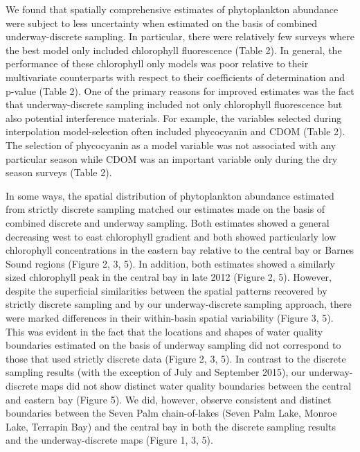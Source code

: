 \documentclass[review]{elsarticle}
\begin{document}
We found that spatially comprehensive estimates of phytoplankton abundance were subject to less uncertainty when estimated on the basis of combined underway-discrete sampling. In particular, there were relatively few surveys where the best model only included chlorophyll fluorescence (Table 2). In general, the performance of these chlorophyll only models was poor relative to their multivariate counterparts with respect to their coefficients of determination and p-value (Table 2). One of the primary reasons for improved estimates was the fact that underway-discrete sampling included not only chlorophyll fluorescence but also potential interference materials. For example, the variables selected during interpolation model-selection often included phycocyanin and CDOM (Table 2). The selection of phycocyanin as a model variable was not associated with any particular season while CDOM was an important variable only during the dry season surveys (Table 2). 

In some ways, the spatial distribution of phytoplankton abundance estimated from strictly discrete sampling matched our estimates made on the basis of combined discrete and underway sampling. Both estimates showed a general decreasing west to east chlorophyll gradient and both showed particularly low chlorophyll concentrations in the eastern bay relative to the central bay or Barnes Sound regions (Figure 2, 3, 5). In addition, both estimates showed a similarly sized chlorophyll peak in the central bay in late 2012 (Figure 2, 5). However, despite the superficial similarities between the spatial patterns recovered by strictly discrete sampling and by our underway-discrete sampling approach, there were marked differences in their within-basin spatial variability (Figure 3, 5). This was evident in the fact that the locations and shapes of water quality boundaries estimated on the basis of underway sampling did not correspond to those that used strictly discrete data (Figure 2, 3, 5). In contrast to the discrete sampling results (with the exception of July and September 2015), our underway-discrete maps did not show distinct water quality boundaries between the central and eastern bay (Figure 5). We did, however, observe consistent and distinct boundaries between the Seven Palm chain-of-lakes (Seven Palm Lake, Monroe Lake, Terrapin Bay) and the central bay in both the discrete sampling results and the underway-discrete maps (Figure 1, 3, 5). 
\end{document}
